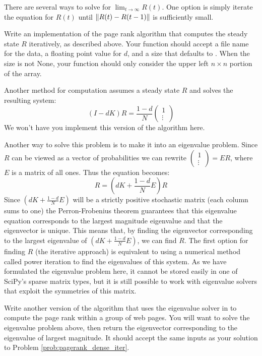 There are several ways to solve for $\lim_{t \to \infty} R(t)$.
One option is simply iterate the equation for $R(t)$ until $\left\lVert R(t)-R(t-1)\right\rVert$ is sufficiently small.

\begin{problem}
\label{prob:pagerank_dense_iter}
Write an implementation of the page rank algorithm that computes the steady state $R$ iteratively, as described above.
Your function should accept a file name for the data, a floating point value for $d$, and a size  that defaults to .
When the size is not None, your function should only consider the upper left $n \times n$ portion of the array.
\end{problem}

Another method for computation assumes a steady state $R$ and solves the resulting system:
\[(I-dK)R = \frac{1-d}{N} \begin{pmatrix}1\\\vdots\end{pmatrix}\]
We won't have you implement this version of the algorithm here.

Another way to solve this problem is to make it into an eigenvalue problem.
Since $R$ can be viewed as a vector of probabilities we can rewrite $\left(\begin{smallmatrix}1\\\vdots\end{smallmatrix}\right) = E R$, where $E$ is a matrix of all ones.
Thus the equation becomes:
\[R = (dK + \frac{1-d}{N}E)R\]
Since $(dK + \frac{1-d}{N}E)$ will be a strictly positive stochastic matrix (each column sums to one) the Perron-Frobenius theorem guarantees that this eigenvalue equation corresponds to the largest magnitude eigenvalue and that the eigenvector is unique.
This means that, by finding the eigenvector corresponding to the largest eigenvalue of $(dK + \frac{1-d}{N}E)$, we can find $R$.
The first option for finding $R$ (the iterative approach) is equivalent to using a numerical method called power iteration to find the eigenvalues of this system.
As we have formulated the eigenvalue problem here, it cannot be stored easily in one of SciPy's sparse matrix types, but it is still possible to work with eigenvalue solvers that exploit the symmetries of this matrix.

\begin{problem}
Write another version of the algorithm that uses the eigenvalue solver in  to compute the page rank within a group of web pages.
You will want to solve the eigenvalue problem above, then return the eigenvector corresponding to the eigenvalue of largest magnitude.
It should accept the same inputs as your solution to Problem \ref{prob:pagerank_dense_iter}.
\end{problem}

